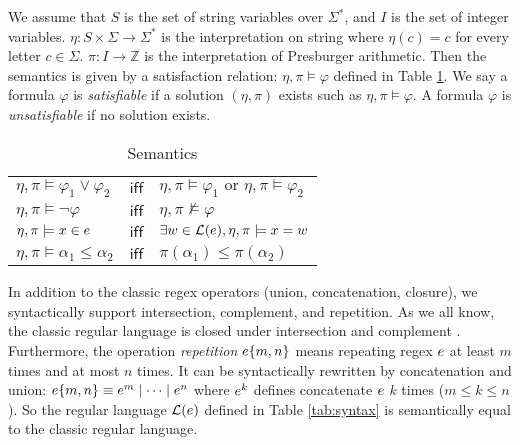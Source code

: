 
We assume that $S$ is the set of string variables over $\Sigma^*$, and $I$ is the set of integer variables. $\eta: S\times\Sigma\rightarrow\Sigma^*$ is the interpretation on string where $\eta(c)=c$ for every letter $c\in \Sigma$. $\pi: I\rightarrow\mathbb{Z}$ is the interpretation of Presburger arithmetic. Then the semantics is given by a satisfaction relation: $\eta, \pi\models \varphi$ defined in Table \ref{tab:semantics}. We say a formula $\varphi$ is \emph{satisfiable} if a solution $(\eta, \pi)$ exists such as $\eta, \pi\models \varphi$. A formula $\varphi$ is \emph{unsatisfiable} if no solution exists.
\begin{table}[h]
  \centering
  \begin{tabular}{lcl}
    $\eta,\pi \models \varphi_1\vee \varphi_2$ & $\mathsf{iff}$ & $\eta,\pi \models \varphi_1 \text{ or } \eta,\pi \models \varphi_2$ \\
    $\eta,\pi \models \neg\varphi $            & $\mathsf{iff}$ & $\eta,\pi \not\models \varphi$                                      \\
    $\eta, \pi \models x\in e$            & $\mathsf{iff}$ & $\exists w \in \mathcal{L}(e),\eta,\pi \models x = w$                 \\
    $\eta, \pi \models \alpha_1 \leq \alpha_2$ & $\mathsf{iff}$ & $\pi(\alpha_1) \leq \pi(\alpha_2) $                                 \\
  \end{tabular}
  \caption{Semantics}
  \label{tab:semantics}
\end{table}
In addition to the classic regex operators (union, concatenation, closure), we syntactically support intersection, complement, and repetition. As we all know, the classic regular language is closed under intersection and complement \cite{aut_hopcraft}. Furthermore, the operation \emph{repetition} $e\{m,n\}$ means repeating regex $e$ at least $m$ times and at most $n$ times. It can be syntactically rewritten by concatenation and union:
$e\{m,n\} \equiv e^m\mid\cdots\mid e^n$ where $e^k$ defines concatenate $e$ $k$ times ($m\leq k\leq n$). So the regular language $\mathcal{L}(e)$ defined in Table \ref{tab:syntax} is semantically equal to the classic regular language.

%